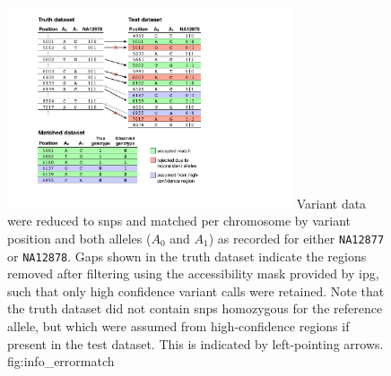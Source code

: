 

\begin{figure}[!tbp]
\centering
\includegraphics[width=0.75\textwidth]{./img/ch4/info_errormatch}
{Variant data were reduced to \glspl{snp} and matched per chromosome by variant position and both alleles ($A_0$ and $A_1$) as recorded for either \texttt{NA12877} or \texttt{NA12878}.
Gaps shown in the truth dataset indicate the regions removed after filtering using the accessibility mask provided by \gls{ipg}, such that only high confidence variant calls were retained.
Note that the truth dataset did not contain \glspl{snp} homozygous for the reference allele, but which were assumed from high-confidence regions if present in the test dataset.
This is indicated by left-pointing arrows.}
{fig:info_errormatch}
\end{figure}
